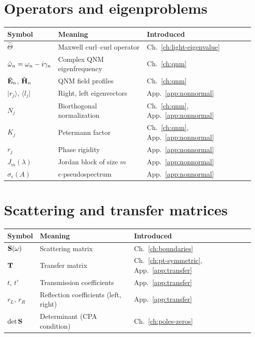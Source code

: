 \section{Operators and eigenproblems}
\label{sec:operator-symbols}

\begin{center}
\begin{tabular}{lll}
\toprule
Symbol & Meaning & Introduced \\
\midrule
$\hat{\Theta}$ & Maxwell curl--curl operator & Ch.~\ref{ch:light-eigenvalue} \\
$\tilde{\omega}_n = \omega_n - i\gamma_n$ & Complex QNM eigenfrequency & Ch.~\ref{ch:qnm} \\
$\tilde{\mathbf{E}}_n$, $\tilde{\mathbf{H}}_n$ & QNM field profiles & Ch.~\ref{ch:qnm} \\
$|r_j\rangle$, $\langle l_j|$ & Right, left eigenvectors & App.~\ref{app:nonnormal} \\
$N_j$ & Biorthogonal normalization & Ch.~\ref{ch:qnm}, App.~\ref{app:nonnormal} \\
$K_j$ & Petermann factor & Ch.~\ref{ch:qnm}, App.~\ref{app:nonnormal} \\
$r_j$ & Phase rigidity & App.~\ref{app:nonnormal} \\
$J_m(\lambda)$ & Jordan block of size $m$ & App.~\ref{app:nonnormal} \\
$\sigma_\epsilon(A)$ & $\epsilon$-pseudospectrum & App.~\ref{app:nonnormal} \\
\bottomrule
\end{tabular}
\end{center}


\section{Scattering and transfer matrices}
\label{sec:scattering-symbols}

\begin{center}
\begin{tabular}{lll}
\toprule
Symbol & Meaning & Introduced \\
\midrule
$\mathbf{S}(\omega)$ & Scattering matrix & Ch.~\ref{ch:boundaries} \\
$\mathbf{T}$ & Transfer matrix & Ch.~\ref{ch:pt-symmetric}, App.~\ref{app:transfer} \\
$t$, $t'$ & Transmission coefficients & App.~\ref{app:transfer} \\
$r_L$, $r_R$ & Reflection coefficients (left, right) & App.~\ref{app:transfer} \\
$\det\mathbf{S}$ & Determinant (CPA condition) & Ch.~\ref{ch:poles-zeros} \\
\bottomrule
\end{tabular}
\end{center}



